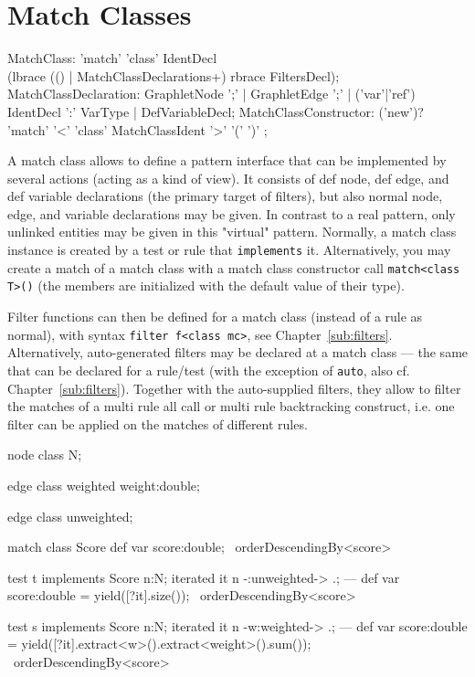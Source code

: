 \section{Match Classes}\label{sec:matchclass}

\begin{rail}
  MatchClass: 'match' 'class' IdentDecl \\
    (lbrace (() | MatchClassDeclarations+) rbrace FiltersDecl);
  MatchClassDeclaration: GraphletNode ';' 
	| GraphletEdge ';' 
	| ('var'|'ref') IdentDecl ':' VarType
	| DefVariableDecl;
  MatchClassConstructor: ('new')? 'match' '<' 'class' MatchClassIdent '>' '(' ')' ;
\end{rail}

A match class allows to define a pattern interface that can be implemented by several actions (acting as a kind of view).
It consists of def node, def edge, and def variable declarations (the primary target of filters), but also normal node, edge, and variable declarations may be given.
In contrast to a real pattern, only unlinked entities may be given in this "virtual" pattern.
Normally, a match class instance is created by a test or rule that \texttt{implements} it.
Alternatively, you may create a match of a match class with a match class constructor call
\texttt{match<class T>()} (the members are initialized with the default value of their type).

Filter functions can then be defined for a match class (instead of a rule as normal), with syntax \texttt{filter f<class mc>}, see Chapter~\ref{sub:filters}.
Alternatively, auto-generated filters may be declared at a match class --- the same that can be declared for a rule/test (with the exception of \texttt{auto}, also cf. Chapter~\ref{sub:filters}).
Together with the auto-supplied filters, they allow to filter the matches of a multi rule all call or multi rule backtracking construct, i.e. one filter can be applied on the matches of different rules.

\begin{example}
  \begin{grgen}
node class N;

edge class weighted
{
	weight:double;
}

edge class unweighted;
  \end{grgen}

  \begin{grgen}
match class Score
{
	def var score:double;
} \ orderDescendingBy<score>

test t implements Score
{
	n:N;
	iterated it {
		n -:unweighted-> .;
	}
---	
	def var score:double = yield([?it].size());
} \ orderDescendingBy<score>

test s implements Score
{
	n:N;
	iterated it {
		n -w:weighted-> .;		
	}
---	
	def var score:double = yield([?it].extract<w>().extract<weight>().sum());
} \ orderDescendingBy<score>
  \end{grgen}\label{exmatchclass}
\end{example}


